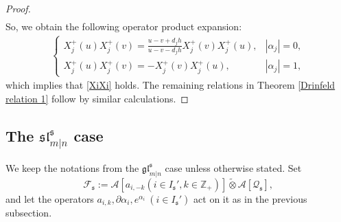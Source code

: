 \documentclass[a4paper,12pt]{article}
\numberwithin{equation}{section}
\begin{document}
\begin{proof}
\begin{align*}
\end{align*}
So, we obtain the following operator product expansion: 
\begin{align*}
\left\{
  \begin{array}{ll}
    X_{j}^{+}(u)X_{j}^{+}(v)=\frac{u-v+d_{j}h}{u-v-d_{j}h}X_{j}^{+}(v)X_{j}^{+}(u), & |\alpha_{j}|=0, \\
    X_{j}^{+}(u)X_{j}^{+}(v)=-X_{j}^{+}(v)X_{j}^{+}(u), & |\alpha_{j}|=1,
  \end{array}
\right.
\end{align*}
which implies that \eqref{XiXi} holds. The remaining relations in Theorem \ref{Drinfeld relation 1} follow by similar calculations.
\end{proof}


\subsection{The $\mathfrak{sl}^{\mathfrak{s}}_{m|n}$ case}

We keep the notations from the $\mathfrak{gl}^{\mathfrak{s}}_{m|n}$ case unless otherwise stated. Set 
$$
\mathcal{F}_{\mathfrak{s}}:=\mathcal{A}[a_{i,-k}(i \in I_{\mathfrak{s}}', k\in\mathbb{Z}_{+})]\widetilde{\otimes}\mathcal{A}[\mathcal{Q}_{\mathfrak{s}}],
$$
and let the operators $a_{i,k}, \partial \alpha_{i}, e^{\alpha_{i}}~( i \in I_{\mathfrak{s}}')$ act on it as in the previous subsection.
\end{document}
